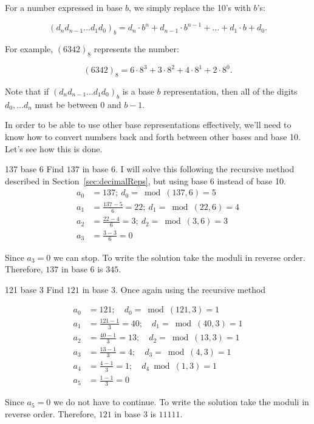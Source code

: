 For a number expressed in base $b$, we simply replace the 10's with $b$'s:

\begin{equation*}
(d_n d_{n-1} \ldots d_1 d_0)_b = d_n \cdot b^n + d_{n-1}\cdot b^{n-1} + \ldots + d_1 \cdot b + d_0.
\end{equation*}
 

For example, $(6342)_8$  represents the number:

\begin{equation*}
 (6342)_8 = 6 \cdot 8^3 + 3 \cdot 8^2 + 4 \cdot 8^1 + 2 \cdot 8^0.
\end{equation*}
 
 Note that if $(d_n d_{n-1} \ldots d_1 d_0)_b$ is a base $b$ representation, then all of the digits
 $d_0, \ldots d_n$ must be between 0 and $b-1$.

In order to be able to use other base representations effectively, we'll need to know how to convert numbers back and forth between 
other bases and base 10.  Let's see how this is done.

\begin{example}{137 base 6}
Find $137$ in base $6$.
I will solve this following the recursive method described in Section~\ref{sec:decimalReps},  but using base 6 instead of base 10. 
\begin{align*}
a_{0}&=137;~d_{0}=\bmod(137,6)=5 \\
a_{1}&=\frac{137-5}{6}=22;~d_{1}=\bmod(22,6)=4 \\
a_{2}&=\frac{22-4}{6}=3;~d_{2}=\bmod(3,6)=3 \\
a_{3}&=\frac{3-3}{6}=0
\end{align*}

Since $a_{3}=0$ we can stop. To write the solution take the moduli in reverse order. Therefore, $137$ in base $6$ is $345$.
\end{example}

\begin{example}{121 base 3}
Find $121$ in base $3$.  Once again using the recursive method

\begin{align*}
a_{0}&=121;\quad d_{0}=\bmod(121,3)=1 \\
a_{1}&=\frac{121-1}{3}=40;\quad d_{1}=\bmod(40,3)=1 \\
a_{2}&=\frac{40-1}{3}=13;\quad d_{2}=\bmod(13,3)=1 \\
a_{3}&=\frac{13-1}{3}=4;\quad d_{3}=\bmod(4,3)=1 \\
a_{4}&=\frac{4-1}{3}=1;\quad d_{4}\bmod(1,3)=1 \\
a_{5}&=\frac{1-1}{3}=0
\end{align*}

Since $a_{5}=0$ we do not have to continue. To write the solution take the moduli in reverse order. Therefore, $121$ in base $3$ is $11111$.
\end{example}


